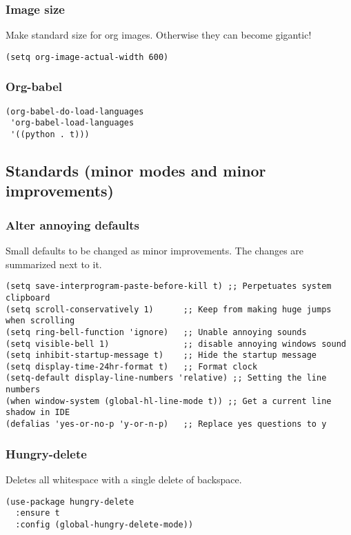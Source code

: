 \documentclass[11pt]{article}
\begin{document}
\subsubsection{Image size}
\label{sec:org21452d3}
Make standard size for org images. Otherwise they can become gigantic!
\begin{verbatim}
(setq org-image-actual-width 600)
\end{verbatim}
\subsubsection{Org-babel}
\label{sec:orga32e5dd}
\begin{verbatim}
(org-babel-do-load-languages
 'org-babel-load-languages
 '((python . t)))
\end{verbatim}
\subsection{Standards (minor modes and minor improvements)}
\label{sec:org6e95e50}
\subsubsection{Alter annoying defaults}
\label{sec:org2459fcc}
Small defaults to be changed as minor improvements. The changes are summarized next to it.
\begin{verbatim}
(setq save-interprogram-paste-before-kill t) ;; Perpetuates system clipboard
(setq scroll-conservatively 1)      ;; Keep from making huge jumps when scrolling
(setq ring-bell-function 'ignore)   ;; Unable annoying sounds
(setq visible-bell 1)               ;; disable annoying windows sound
(setq inhibit-startup-message t)    ;; Hide the startup message
(setq display-time-24hr-format t)   ;; Format clock
(setq-default display-line-numbers 'relative) ;; Setting the line numbers
(when window-system (global-hl-line-mode t)) ;; Get a current line shadow in IDE
(defalias 'yes-or-no-p 'y-or-n-p)   ;; Replace yes questions to y
\end{verbatim}
\subsubsection{Hungry-delete}
\label{sec:org5b689b6}
Deletes all whitespace with a single delete of backspace.
\begin{verbatim}
(use-package hungry-delete
  :ensure t
  :config (global-hungry-delete-mode))
\end{verbatim}
\end{document}
